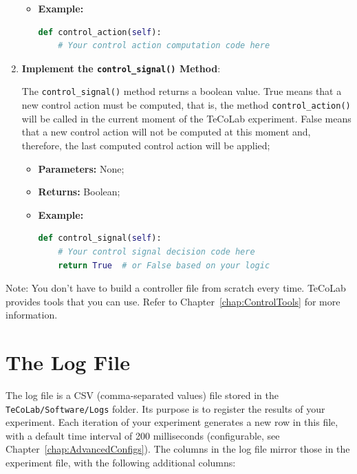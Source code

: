\documentclass[12pt]{report}
\begin{document}
\begin{enumerate}
\begin{itemize}
\item \textbf{Example:}
\begin{lstlisting}[language = Python]
def control_action(self):
    # Your control action computation code here
\end{lstlisting}

\end{itemize}
\item \textbf{Implement the \texttt{control\_signal()} Method}:

The \texttt{control\_signal()} method returns a boolean value. True means that a new control action must be computed, that is, the method \texttt{control\_action()} will be called in the current moment of the TeCoLab experiment. False means that a new control action will not be computed at this moment and, therefore, the last computed control action will be applied;

\begin{itemize}

\item \textbf{Parameters:} None;

\item \textbf{Returns:} Boolean;

\item \textbf{Example:}
\begin{lstlisting}[language = Python]
def control_signal(self):
    # Your control signal decision code here
    return True  # or False based on your logic
\end{lstlisting}
\end{itemize}
\end{enumerate}

Note: You don't have to build a controller file from scratch every time. TeCoLab provides tools that you can use. Refer to Chapter~\ref{chap:ControlTools} for more information.

\section{The Log File}\label{sec:LogFile}

The log file is a CSV (comma-separated values) file stored in the \texttt{TeCoLab/Software/Logs} folder. Its purpose is to register the results of your experiment. Each iteration of your experiment generates a new row in this file, with a default time interval of 200 milliseconds (configurable, see Chapter~\ref{chap:AdvancedConfigs}). The columns in the log file mirror those in the experiment file, with the following additional columns:
\end{document}
